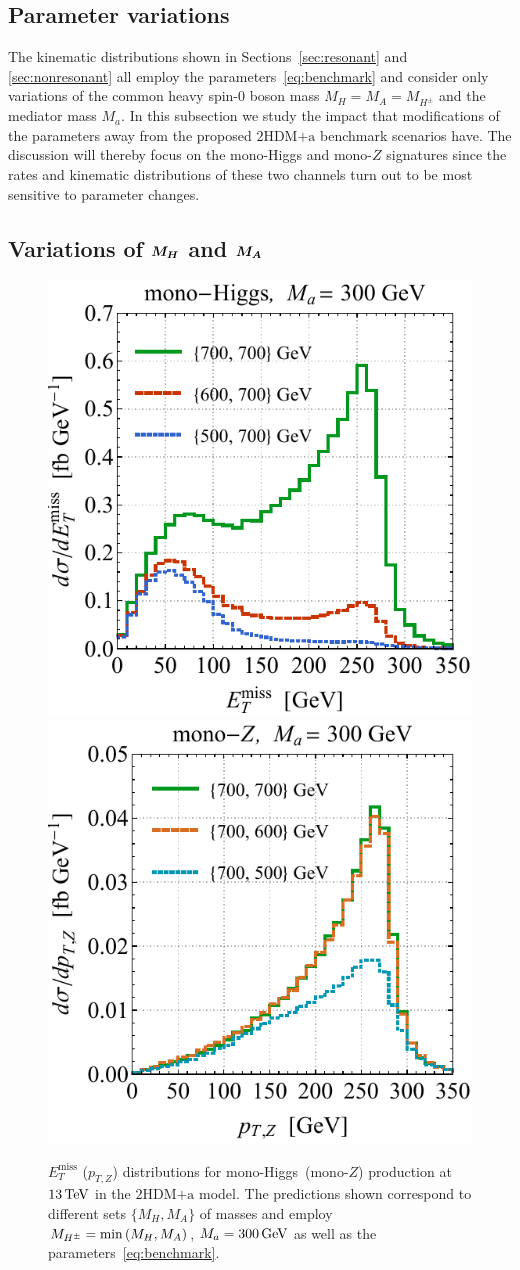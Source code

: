 \documentclass[a4paper, 11pt,notoc]{article}
\newcommand{\MET}{\ensuremath{E_T^\mathrm{miss}}\xspace}
\newcommand{\mA}{\ensuremath{M_{A}}\xspace}
\newcommand{\ma}{\ensuremath{M_{a}}\xspace}
\newcommand{\mH}{\ensuremath{M_{H}}\xspace}
\newcommand{\mHc}{\ensuremath{M_{H^{\pm}}}\xspace}
\newcommand{\hdma}{\ensuremath{\textrm{2HDM+a}}\xspace}
\def\bm#1{\mbox{\boldmath$#1$\unboldmath}}
\begin{document}
\subsection{Parameter variations}
\label{sec:parameter_variations}

The  kinematic distributions shown in Sections~\ref{sec:resonant} and \ref{sec:nonresonant}  all employ the parameters~\eqref{eq:benchmark} and consider only variations of the common heavy  spin-0 boson  mass $\mH = \mA = \mHc$ and the mediator mass $\ma$.  In this subsection we study the impact that modifications of the parameters away from the proposed \hdma benchmark scenarios have. The  discussion will thereby focus on the mono-Higgs and mono-$Z$ signatures since the rates and kinematic distributions of these two channels turn out to be  most sensitive to parameter changes. 

\subsection{Variations of $\bm{\mH}$ and $\bm{\mA}$}

\begin{figure}[t!]
\centering
\includegraphics[height=0.45\textwidth]{mvarl.pdf} \qquad 
\includegraphics[height=0.45\textwidth]{mvarr.pdf}
\vspace{2mm}
\caption{\label{fig:mvar} $\MET$ ($p_{T,Z}$) distributions for mono-Higgs~(mono-$Z$) production at $13 \, {\rm TeV}$ in the \hdma model.  The  predictions shown correspond to different sets $\{M_{H}, M_A\}$ of masses and employ $\mHc = {\rm min} \left ( \mH, \mA \right )$, $M_a = 300 \, {\rm GeV}$  as well as the parameters~\eqref{eq:benchmark}.}
\end{figure}
\end{document}
